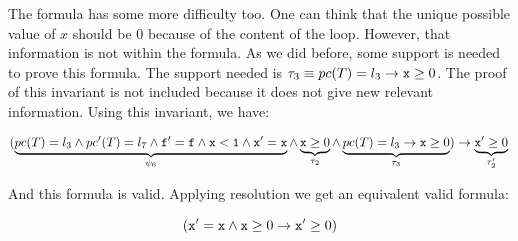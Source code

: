	The formula has some more difficulty too.
	One can think that the unique possible value of $x$ should be $0$ because of the content of the loop.
	However, that information is not within the formula.
	As we did before, some support is needed to prove this formula.
	The support needed is $\tau_3 \equiv pc(T) = l_3 \to \mathtt{x} \geq 0$.
	The proof of this invariant is not included because it does not give new relevant information. 
	Using this invariant, we have:

	

	\begin{equation*}
		(
			\underbrace{pc(T) = l_3 \wedge pc'(T) = l_7 \wedge \mathtt{f'=f} \wedge \mathtt{x<1} \wedge \mathtt{x'=x}}_{\psi_6} \wedge \underbrace{\mathtt{x} \geq 0}_{\tau_2} \wedge \underbrace{pc(T) = l_3 \to \mathtt{x}\geq 0 }_{\tau_3}
		) 
			\to \underbrace{\mathtt{x}' \geq 0}_{\tau_2'}\\\\
	\end{equation*}

	
	And this formula is valid. Applying resolution we get an equivalent valid formula:

	\[
		(
			\mathtt{x'=x}  \wedge \mathtt{x}\geq 0 \to \mathtt{x'}\geq 0
		)
	\]


